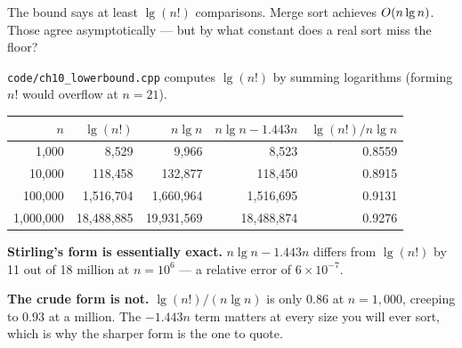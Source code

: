 The bound says at least $\lg(n!)$ comparisons. Merge sort achieves
$O(n\operatorname{lg} n)$. Those agree asymptotically --- but by what constant does a
real sort miss the floor?

\begin{worked}
\texttt{code/ch10\_lowerbound.cpp} computes $\lg(n!)$ by summing logarithms
(forming $n!$ would overflow at $n = 21$).

\begin{center}
\begin{tabular}{@{}rrrrr@{}}
\toprule
\rowcolor{primary!15}
$n$ & $\lg(n!)$ & $n\lg n$ & $n\lg n - 1.443n$ & $\lg(n!)/n\lg n$ \\
\midrule
1{,}000     &       8{,}529 &       9{,}966 &       8{,}523 & 0.8559 \\
10{,}000    &     118{,}458 &     132{,}877 &     118{,}450 & 0.8915 \\
100{,}000   &   1{,}516{,}704 &   1{,}660{,}964 &   1{,}516{,}695 & 0.9131 \\
1{,}000{,}000 & 18{,}488{,}885 & 19{,}931{,}569 & 18{,}488{,}874 & 0.9276 \\
\bottomrule
\end{tabular}
\end{center}

\smallskip
\textbf{Stirling's form is essentially exact.} $n\lg n - 1.443n$ differs from
$\lg(n!)$ by 11 out of 18 million at $n = 10^{6}$ --- a relative error of
$6 \times 10^{-7}$.

\smallskip
\textbf{The crude form is not.} $\lg(n!)/(n\lg n)$ is only $0.86$ at
$n = 1{,}000$, creeping to $0.93$ at a million. The $-1.443n$ term matters at
every size you will ever sort, which is why the sharper form is the one to
quote.
\end{worked}

